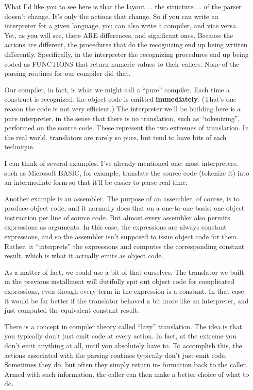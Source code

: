 What I'd like you to see here is that the  layout  ... the structure ... of  the  parser  doesn't  change. It's only the actions that change. So  if  you  can  write an interpreter for a given language, you can also write a compiler, and vice versa. Yet, as you  will  see, there  ARE  differences, and  significant ones. Because the actions are different, the  procedures  that  do the recognizing end up being written differently. Specifically, in the interpreter  the recognizing procedures end up being coded as FUNCTIONS that return numeric values to their callers. None of the parsing routines for our compiler did that.

Our compiler, in fact, is  what we might call a ``pure'' compiler. Each time a construct is recognized, the object  code  is emitted {\bfseries immediately}. (That's one reason the code is not very efficient.) The interpreter we'll be building  here is a pure interpreter, in the sense that there is  no  translation, such  as ``tokenizing'', performed on the source code. These represent  the  two extremes of translation. In  the  real  world, translators are rarely so pure, but tend to have bits of each technique.

I can think of  several  examples. I've already mentioned one: most interpreters, such as Microsoft BASIC, for  example, translate the source code (tokenize it) into an  intermediate  form so that it'll be easier to parse real time.

Another example is an assembler. The purpose of an assembler, of course, is to produce object code, and it normally does that on a one-to-one basis: one object instruction per line of source code. But almost every assembler also permits expressions as arguments. In this case, the expressions  are  always  constant expressions, and  so the assembler isn't supposed to  issue  object  code  for them. Rather, it  ``interprets'' the expressions and computes the corresponding constant result, which is what it actually emits as object code.

As a matter of fact, we  could  use  a bit of that ourselves. The translator we built in the  previous  installment  will dutifully spit out object code  for  complicated  expressions, even though every term in  the  expression  is  a  constant. In that case it would be far better if the translator behaved a bit more  like an interpreter, and just computed the equivalent constant result.

There is  a concept in compiler theory called ``lazy'' translation. The  idea is that you typically don't just  emit  code  at  every action. In fact, at the extreme you don't emit anything  at all, until  you  absolutely  have to. To accomplish this, the actions associated with the parsing routines  typically  don't  just emit code. Sometimes  they  do, but  often  they  simply  return in- formation back to the caller. Armed with  such  information, the caller can then make a better choice of what to do.


